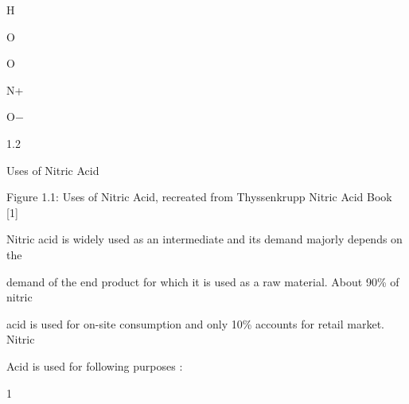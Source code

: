 \documentclass[a4paper,portrait,12pt]{article}
\begin{document}
\begin{flushleft}
H
\end{flushleft}


\begin{flushleft}
O
\end{flushleft}





\begin{flushleft}
O
\end{flushleft}


\begin{flushleft}
N+
\end{flushleft}


\begin{flushleft}
O$-$
\end{flushleft}





1.2





\begin{flushleft}
Uses of Nitric Acid
\end{flushleft}





\begin{flushleft}
Figure 1.1: Uses of Nitric Acid, recreated from Thyssenkrupp Nitric Acid Book [1]
\end{flushleft}





\begin{flushleft}
Nitric acid is widely used as an intermediate and its demand majorly depends on the
\end{flushleft}


\begin{flushleft}
demand of the end product for which it is used as a raw material. About 90\% of nitric
\end{flushleft}


\begin{flushleft}
acid is used for on-site consumption and only 10\% accounts for retail market. Nitric
\end{flushleft}


\begin{flushleft}
Acid is used for following purposes :
\end{flushleft}


1
\end{document}
